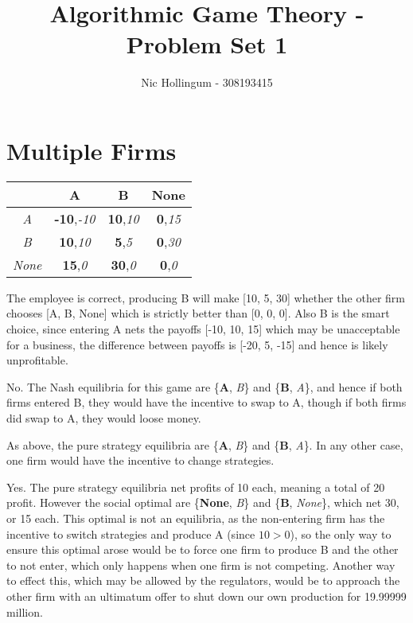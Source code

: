 \documentclass{article}
\author{Nic Hollingum - 308193415}
\title{Algorithmic Game Theory - Problem Set 1}
\begin{document}
\maketitle

\section {Multiple Firms}
\begin{center}
\begin{tabular}{ | c | c | c | c |}
\hline
 & 				{\bf A} & 				{\bf B} & 			{\bf None} \\ \hline
{\em A} &		{\bf -10},{\em -10} &	{\bf 10},{\em 10} &	{\bf 0},{\em 15} \\ \hline
{\em B} &		{\bf 10},{\em 10} &		{\bf 5},{\em 5} &	{\bf 0},{\em 30} \\ \hline
{\em None} &	{\bf 15},{\em 0} &		{\bf 30},{\em 0} &	{\bf 0},{\em 0} \\ \hline
\end{tabular}
\end{center}

The employee is correct, producing B will make [10, 5, 30] whether the other firm chooses [A, B, None] which is strictly better than [0, 0, 0].
Also B is the smart choice, since entering A nets the payoffs [-10, 10, 15] which may be unacceptable for a business, the difference between payoffs is [-20, 5, -15] and hence is likely unprofitable.

No.
The Nash equilibria for this game are \{{\bf A}, {\em B}\} and \{{\bf B}, {\em A}\}, and hence if both firms entered B, they would have the incentive to swap to A, though if both firms did swap to A, they would loose money.

As above, the pure strategy equilibria are \{{\bf A}, {\em B}\} and \{{\bf B}, {\em A}\}.
In any other case, one firm would have the incentive to change strategies.

Yes.
The pure strategy equilibria net profits of 10 each, meaning a total of 20 profit.
However the social optimal are \{{\bf None}, {\em B}\} and \{{\bf B}, {\em None}\}, which net 30, or 15 each.
This optimal is not an equilibria, as the non-entering firm has the incentive to switch strategies and produce A (since $10 > 0$), so the only way to ensure this optimal arose would be to force one firm to produce B and the other to not enter, which only happens when one firm is not competing.
Another way to effect this, which may be allowed by the regulators, would be to approach the other firm with an ultimatum offer to shut down our own production for 19.99999 million.
\end{document}
